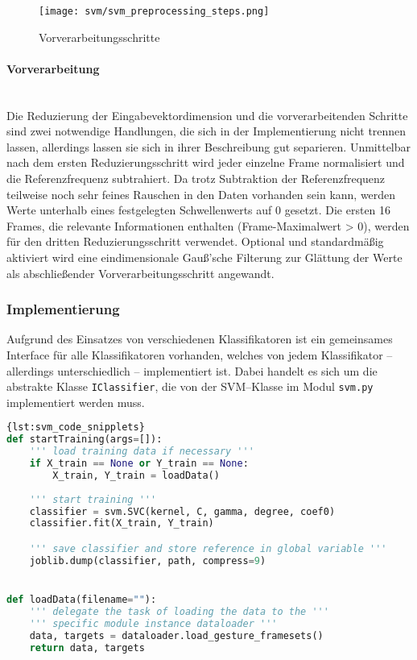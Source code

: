\begin{figure*}[htbp] \centering
    \texttt{[image: svm/svm\_preprocessing\_steps.png]}
    \caption{Vorverarbeitungsschritte}
    \label{fig:svm_preprocessing_steps}
\end{figure*}

\paragraph{Vorverarbeitung}\label{sec:svm_preprocess}$\;$ \\\\
Die Reduzierung der Eingabevektordimension und die vorverarbeitenden Schritte sind zwei notwendige Handlungen, die sich in der Implementierung nicht trennen lassen, allerdings lassen sie sich in ihrer Beschreibung gut separieren.
Unmittelbar nach dem ersten Reduzierungsschritt wird jeder einzelne Frame normalisiert und die Referenzfrequenz subtrahiert.
Da trotz Subtraktion der Referenzfrequenz teilweise noch sehr feines Rauschen in den Daten vorhanden sein kann, werden Werte unterhalb eines festgelegten Schwellenwerts auf 0 gesetzt.
Die ersten 16 Frames, die relevante Informationen enthalten (Frame-Maximalwert > 0), werden für den dritten Reduzierungsschritt verwendet.
Optional und standardmäßig aktiviert wird eine eindimensionale Gauß'sche Filterung zur Glättung der Werte als abschließender Vorverarbeitungsschritt angewandt.

\subsubsection{Implementierung}\label{sec:svm_implementation}
Aufgrund des Einsatzes von verschiedenen Klassifikatoren ist ein gemeinsames Interface für alle Klassifikatoren vorhanden, welches von jedem Klassifikator -- allerdings unterschiedlich -- implementiert ist. 
Dabei handelt es sich um die abstrakte Klasse \texttt{IClassifier}, die von der \ac{SVM}--Klasse im Modul \texttt{svm.py}  implementiert werden muss.

\begin{lstlisting}[float=*,language=Python,caption={Code Snipplets},label={lst:svm_code_snipplets}]{lst:svm_code_snipplets}
def startTraining(args=[]):
	''' load training data if necessary '''
	if X_train == None or Y_train == None:
		X_train, Y_train = loadData()
	
	''' start training '''
	classifier = svm.SVC(kernel, C, gamma, degree, coef0)
	classifier.fit(X_train, Y_train)

	''' save classifier and store reference in global variable '''
	joblib.dump(classifier, path, compress=9)


def loadData(filename=""):
	''' delegate the task of loading the data to the ''' 
	''' specific module instance dataloader '''
	data, targets = dataloader.load_gesture_framesets()
	return data, targets
\end{lstlisting}


